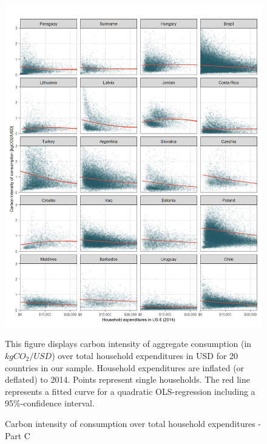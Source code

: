 \documentclass[12pt, a4paper]{article}
\newenvironment{subcaption}
{\strut
\vspace{-5pt}
\begin{minipage}[b]{0.9\textwidth}
  \hspace*{-\parindent}
  \footnotesize}
 {\end{minipage}}
\begin{document}
\begin{figure}[ht!]
  \centering
  \caption{Carbon intensity of consumption over total household expenditures - Part C} \label{fig:C3}
  \includegraphics{Analysis_Carbon_Intensity_Curve/All_Panel_C}
  \begin{subcaption}
    This figure displays carbon intensity of aggregate consumption (in $kgCO_{2}/USD$) over total household expenditures in USD for 20 countries in our sample. Household expenditures are inflated (or deflated) to 2014. Points represent single households. The red line represents a fitted curve for a quadratic OLS-regression including a 95\%-confidence interval.
  \end{subcaption}

\end{figure}

\clearpage
\end{document}
